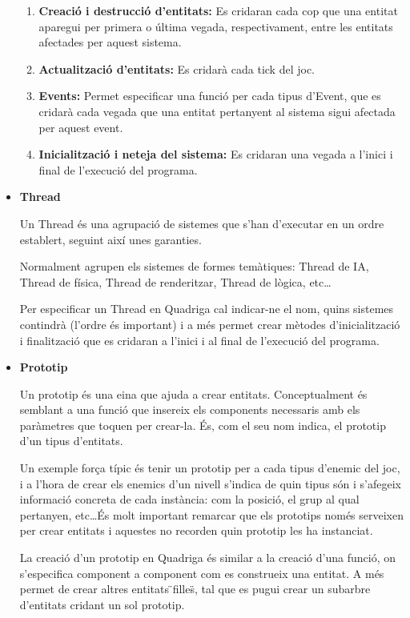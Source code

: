 \begin{itemize}
      \begin{enumerate}
        \item {\bf Creació i destrucció d'entitats:} Es cridaran cada cop que una entitat aparegui per primera o última vegada, respectivament, entre les entitats afectades per aquest sistema.
        \item {\bf Actualització d'entitats:} Es cridarà cada tick del joc.
        \item {\bf Events:} Permet especificar una funció per cada tipus d'Event, que es cridarà cada vegada que una entitat pertanyent al sistema sigui afectada per aquest event.
        \item {\bf Inicialització i neteja del sistema:} Es cridaran una vegada a l'inici i final de l'execució del programa.
      \end{enumerate}
      
    \item{\bf Thread}

      Un Thread és una agrupació de sistemes que s'han d'executar en un ordre establert, seguint així unes garanties.
      
      Normalment agrupen els sistemes de formes temàtiques: Thread de IA, Thread de física, Thread de renderitzar, Thread de lògica, etc\ldots
      
      Per especificar un Thread en Quadriga cal indicar-ne el nom, quins sistemes contindrà (l'ordre és important) i a més permet crear mètodes d'inicialització i finalització que es cridaran a l'inici i al final de l'execució del programa.

    \item{\bf Prototip}

      Un prototip és una eina que ajuda a crear entitats. Conceptualment és semblant a una funció que insereix els components necessaris amb els paràmetres que toquen per crear-la. És, com el seu nom indica, el prototip d'un tipus d'entitats.
      
      Un exemple força típic és tenir un prototip per a cada tipus d'enemic del joc, i a l'hora de crear els enemics d'un nivell s'indica de quin tipus són i s'afegeix informació concreta de cada instància: com la posició, el grup al qual pertanyen, etc\ldots És molt important remarcar que els prototips només serveixen per crear entitats i aquestes no recorden quin prototip les ha instanciat.
      
      La creació d'un prototip en Quadriga és similar a la creació d'una funció, on s'especifica component a component com es construeix una entitat. A més permet de crear altres entitats \"{}filles\"{}, tal que es pugui crear un subarbre d'entitats cridant un sol prototip.


\end{itemize}
